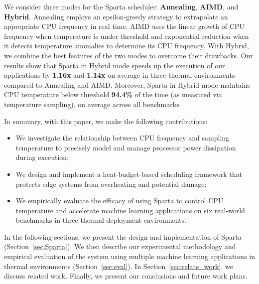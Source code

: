 We consider three modes for the Sparta scheduler: \textbf{Annealing}, \textbf{AIMD}, and \textbf{Hybrid}.  Annealing employs an epsilon-greedy strategy to extrapolate 
an appropriate CPU frequency in real time. 
AIMD uses the linear growth of CPU frequency when temperature is under threshold and 
exponential reduction when it detects temperature anomalies to determine its 
CPU frequency.  With Hybrid, we combine the best features of the two modes to overcome their drawbacks. Our results show that Sparta in Hybrid mode speeds up the execution of our applications by \textbf{1.16x} and \textbf{1.14x} on average in three thermal environments compared to Annealing and AIMD. Moreover, Sparta in Hybrid mode maintains CPU
temperature below threshold \textbf{94.4\%} of the time (as measured via temperature
sampling), on average across all benchmarks. 

In summary, with this paper, we make the following contributions:
\begin{itemize}
    \item We investigate the relationship between CPU frequency and sampling temperature to precisely model and manage processor power dissipation during execution;
    \vspace{1mm}
    \item We design and implement a heat-budget-based scheduling framework that protects edge systems from overheating and potential damage;
    \vspace{1mm}
    \item We empirically evaluate the efficacy of using Sparta to control CPU temperature and accelerate machine learning applications on six real-world benchmarks in three thermal deployment environments. 
\end{itemize}
In the following sections, we present the design and implementation of Sparta (Section~\ref{sec:Sparta}). We then describe our experimental methodology and empirical evaluation of the system using multiple machine learning applications in thermal environments (Section~\ref{sec:eval}). In Section~\ref{sec:relate_work},  we discuss related work. Finally, we present our conclusions and future work plans.

